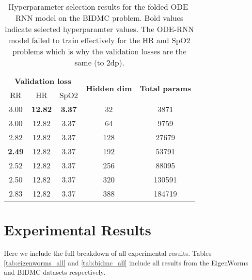\documentclass{article}
\begin{document}
\begin{table*}[t]
    \scriptsize
    \begin{center}
        \begin{tabular}{ccccc}
        \toprule
        \multicolumn{3}{c}{\textbf{Validation loss}} & \multirow{2}{*}{\textbf{Hidden dim}} & \multirow{2}{*}{\textbf{Total params}} \\
        \cmidrule(lr){1-3}
        RR & HR & SpO2 & & \\
        \midrule
        3.00 &     \textbf{12.82} &     \textbf{3.37} &               32 &        3871 \\
        3.00 &     12.82 &      3.37 &               64 &        9759 \\
        2.82 &     12.82 &      3.37 &              128 &       27679 \\
        \textbf{2.49} &     12.82 &      3.37 &              192 &       53791 \\
        2.52 &     12.82 &      3.37 &              256 &       88095 \\
        2.50 &     12.82 &      3.37 &              320 &      130591 \\
        2.83 &     12.82 &      3.37 &              388 &      184719 \\
        \bottomrule
        \end{tabular}
    \end{center}
    \caption{Hyperparameter selection results for the folded ODE-RNN model on the BIDMC problem. Bold values indicate selected hyperparamter values. The ODE-RNN model failed to train effectively for the HR and SpO2 problems which is why the validation losses are the same (to 2dp).}
    \label{tab:bidmc_hyper_odernn}
\end{table*}  
\section{Experimental Results} \label{apx:results}
Here we include the full breakdown of all experimental results. Tables \ref{tab:eigenworms_all} and \ref{tab:bidmc_all} include all results from the EigenWorms and BIDMC datasets respectively.
\end{document}
